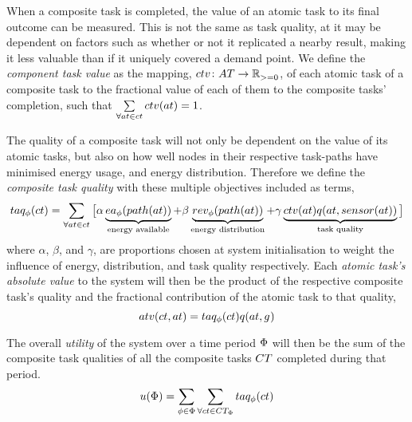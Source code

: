 When a composite task is completed, the value of an atomic task to its final outcome can be measured. This is not the same as task quality, at it may be dependent on factors such as whether or not it replicated a nearby result, making it less valuable than if it uniquely covered a demand point. We define the \textit{component task value} as the mapping, $\formalComponentTaskValue{}{}$,  of each atomic task of a composite task to the fractional value of each of them to the composite tasks' completion, such that $\sum\limits_{\forall \varAtomicTask{}{} \in \varCompositeTask{}{}} \functionComponentTaskValue{}{} = 1$.

The quality of a composite task will not only be dependent on the value of its atomic tasks, but also on how well nodes in their respective task-paths have minimised energy usage, and energy distribution. Therefore we define the \textit{composite task quality} with these multiple objectives included as terms,
\begin{equation}
	\label{eq:ctv}
	\functionCompositeTaskQuality{}{} = 
	\sum\limits_{\forall \varAtomicTask{}{} \in \varCompositeTask{}{}}
	\big\lbrack
	\alpha\underbrace{\functionEnergyAvailable{\functionTaskArc{}{}}{}}_{\text{energy available}}
	+ \beta\underbrace{\functionEnergyVariability{\functionTaskArc{}{}}{}}_{\text{energy distribution}}
	+ 
	\gamma\underbrace{
		\functionComponentTaskValue{}{}
		\functionAtomicTaskQualitySignature{\varAtomicTask{}{}}{\functionSenseRole{}{}}
	}_{\text{task quality}}
\big\rbrack
\end{equation}
where $\alpha$, $\beta$, and $\gamma$, are proportions chosen at system initialisation to weight the influence of energy, distribution, and task quality respectively. Each \textit{atomic task's absolute value} to the system will then be the product of the respective composite task's quality and the fractional contribution of the atomic task to that quality,
\begin{equation}
	\functionTaskAbsoluteValue{}{} = 
	\functionCompositeTaskQuality{}{}
	\functionAtomicTaskQualitySignature{}{}
\end{equation}

The overall \textit{ utility} of the system over a time period $\Phi$ will then be the sum of the composite task qualities of all the composite tasks $\setCompositeTask{}{}$ completed during that period.
	\begin{equation}
		\label{eq:system_utility}
		\functionSystemUtility{}{} = \sum\limits_{\varTime{}{} \in \setTime{}{}}
		\sum\limits_{\forall \varCompositeTask{}{} \in \setCompositeTask{\setTime{}{}}{}}
		\functionCompositeTaskQuality{}{}
	\end{equation}